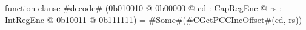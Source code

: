 function clause #\hyperref[sailMIPSzdecode]{decode}# (0b010010 @ 0b00000 @ cd : CapRegEnc @ rs : IntRegEnc @   0b10011 @ 0b111111) = #\hyperref[sailMIPSzSome]{Some}#(#\hyperref[sailMIPSzCGetPCCIncOffset]{CGetPCCIncOffset}#(cd, rs))
